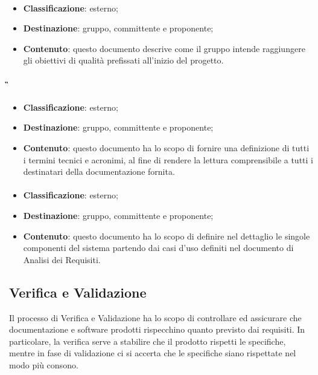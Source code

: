 			\paragraph{\PdQ}
			\begin{itemize}
				\item \textbf{Classificazione}: esterno;
				\item \textbf{Destinazione}: gruppo, committente e proponente;
				\item \textbf{Contenuto}: questo documento descrive come il gruppo \textit{\gruppo} intende raggiungere gli obiettivi di qualità prefissati all'inizio del progetto.
			\end{itemize}

			\paragraph{\G}
			\begin{itemize}
				\item \textbf{Classificazione}: esterno;
				\item \textbf{Destinazione}: gruppo, committente e proponente;
				\item \textbf{Contenuto}: questo documento ha lo scopo di fornire una definizione di tutti i termini tecnici e acronimi, al fine di rendere la lettura comprensibile a tutti i destinatari della documentazione fornita.
			\end{itemize}
		\paragraph{\ST}
		\begin{itemize}
			\item \textbf{Classificazione}: esterno;
			\item \textbf{Destinazione}: gruppo, committente e proponente;
			\item \textbf{Contenuto}: questo documento ha lo scopo di definire nel dettaglio le singole componenti del sistema partendo dai casi d'uso definiti nel documento di Analisi dei Requisiti.
		\end{itemize}

	\subsection{Verifica e Validazione}
	Il processo di Verifica e Validazione ha lo scopo di controllare ed assicurare che documentazione e software prodotti rispecchino quanto previsto dai requisiti. In particolare, la verifica serve a stabilire che il prodotto rispetti le specifiche, mentre in fase di validazione ci si accerta che le specifiche siano rispettate nel modo più consono.

